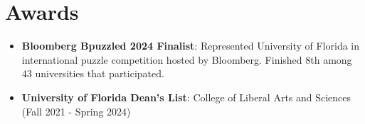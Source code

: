 \documentclass[letterpaper,11pt]{article}
\newcommand{\resumeItemSkills}[2]{
  \item\normalsize{
    \textbf{#1}{: #2 \vspace{-2pt}}
  }
}
\newcommand{\resumeSubItemSkills}[2]{\resumeItemSkills{#1}{#2}\vspace{-4pt}}
\newcommand{\resumeSubHeadingListStartSkillsAwards}{\begin{itemize}[leftmargin=*]}
\newcommand{\resumeSubHeadingListEnd}{\end{itemize}}
\begin{document}
\section{Awards}
  \resumeSubHeadingListStartSkillsAwards
    \resumeSubItemSkills{Bloomberg Bpuzzled 2024 Finalist}
      {Represented University of Florida in international puzzle competition hosted by Bloomberg. Finished 8th among 43 universities that participated.}
    \resumeSubItemSkills{University of Florida Dean's List}
      {College of Liberal Arts and Sciences (Fall 2021 - Spring 2024)}
  \resumeSubHeadingListEnd
  
\end{document}
